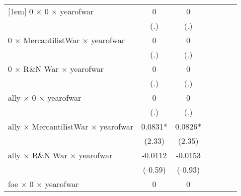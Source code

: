 {\begin{tabular}{l*{6}{c}}
[1em]
0 $\times$ 0 $\times$ yearofwar&           0         &           0         &                     &                     &                     &                     \\
                    &         (.)         &         (.)         &                     &                     &                     &                     \\
[1em]
0 $\times$ MercantilistWar $\times$ yearofwar&           0         &           0         &                     &                     &                     &                     \\
                    &         (.)         &         (.)         &                     &                     &                     &                     \\
[1em]
0 $\times$ R\&N War $\times$ yearofwar&           0         &           0         &                     &                     &                     &                     \\
                    &         (.)         &         (.)         &                     &                     &                     &                     \\
[1em]
ally $\times$ 0 $\times$ yearofwar&           0         &           0         &                     &                     &                     &                     \\
                    &         (.)         &         (.)         &                     &                     &                     &                     \\
[1em]
ally $\times$ MercantilistWar $\times$ yearofwar&      0.0831*  &      0.0826*  &                     &                     &                     &                     \\
                    &      (2.33)         &      (2.35)         &                     &                     &                     &                     \\
[1em]
ally $\times$ R\&N War $\times$ yearofwar&     -0.0112         &     -0.0153         &                     &                     &                     &                     \\
                    &     (-0.59)         &     (-0.93)         &                     &                     &                     &                     \\
[1em]
foe $\times$ 0 $\times$ yearofwar&           0         &           0         &                     &                     &                     &                     \\

\end{tabular}}
